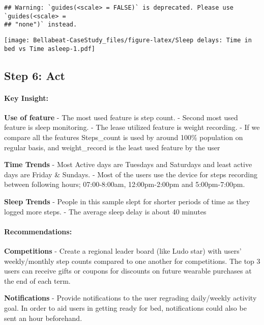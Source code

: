 \documentclass[
]{article}
\begin{document}
\begin{verbatim}
## Warning: `guides(<scale> = FALSE)` is deprecated. Please use `guides(<scale> =
## "none")` instead.
\end{verbatim}

\texttt{[image: Bellabeat-CaseStudy\_files/figure-latex/Sleep delays: Time in bed vs Time asleep-1.pdf]}

\hfill\break
\hfill\break

\hypertarget{step-6-act}{%
\subsection{Step 6: Act}\label{step-6-act}}

\hypertarget{key-insight}{%
\paragraph{\texorpdfstring{\textbf{Key
Insight:}}{Key Insight:}}\label{key-insight}}

\textbf{Use of feature} - The most used feature is step count. - Second
most used feature is sleep monitoring. - The lease utilized feature is
weight recording. - If we compare all the features Steps\_count is used
by around 100\% population on regular basis, and weight\_record is the
least used feature by the user

\textbf{Time Trends} - Most Active days are Tuesdays and Saturdays and
least active days are Friday \& Sundays. - Most of the users use the
device for steps recording between following hours; 07:00-8:00am,
12:00pm-2:00pm and 5:00pm-7:00pm.

\textbf{Sleep Trends} - People in this sample slept for shorter periods
of time as they logged more steps. - The average sleep delay is about 40
minutes

\hypertarget{recommendations}{%
\paragraph{\texorpdfstring{\textbf{Recommendations:}}{Recommendations:}}\label{recommendations}}

\textbf{Competitions} - Create a regional leader board (like Ludo star)
with users' weekly/monthly step counts compared to one another for
competitions. The top 3 users can receive gifts or coupons for discounts
on future wearable purchases at the end of each term.

\textbf{Notifications} - Provide notifications to the user regrading
daily/weekly activity goal. In order to aid users in getting ready for
bed, notifications could also be sent an hour beforehand.
\end{document}
